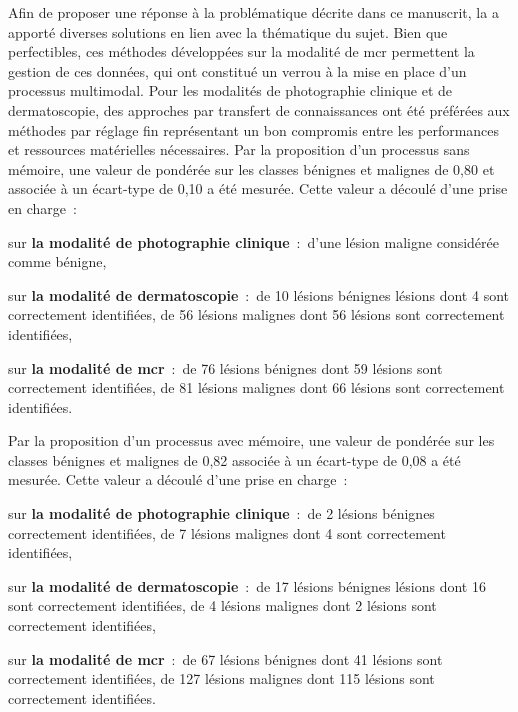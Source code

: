 Afin de proposer une réponse à la problématique décrite dans ce manuscrit, la  a apporté diverses solutions en lien avec la thématique du sujet. Bien que perfectibles, ces méthodes développées sur la modalité de \gls{mcr} permettent la gestion de ces données, qui ont constitué un verrou à la mise en place d'un processus multimodal. Pour les modalités de photographie clinique et de dermatoscopie, des approches par transfert de connaissances ont été préférées aux méthodes par réglage fin représentant un bon compromis entre les performances et ressources matérielles nécessaires. Par la proposition d'un processus sans mémoire, une valeur de \fscore{} pondérée sur les classes bénignes et malignes de 0,80 et associée à un écart-type de 0,10 a été mesurée. Cette valeur a découlé d'une prise en charge~:
\begin{inlinerate}
    \item sur \textbf{la modalité de photographie clinique}~:~d'une lésion maligne considérée comme bénigne,
    \item sur \textbf{la modalité de dermatoscopie}~:~de 10 lésions bénignes lésions dont 4 sont correctement identifiées, de 56 lésions malignes dont 56 lésions sont correctement identifiées,
    \item sur \textbf{la modalité de \gls{mcr}}~:~de 76 lésions bénignes dont 59 lésions sont correctement identifiées, de 81 lésions malignes dont 66 lésions sont correctement identifiées.
\end{inlinerate} Par la proposition d'un processus avec mémoire, une valeur de \fscore{} pondérée sur les classes bénignes et malignes de 0,82 associée à un écart-type de 0,08 a été mesurée. Cette valeur a découlé d'une prise en charge~:
\begin{inlinerate}
    \item sur \textbf{la modalité de photographie clinique}~:~de 2 lésions bénignes correctement identifiées, de 7 lésions malignes dont 4 sont correctement identifiées,
    \item sur \textbf{la modalité de dermatoscopie}~:~de 17 lésions bénignes lésions dont 16 sont correctement identifiées, de 4 lésions malignes dont 2 lésions sont correctement identifiées,
    \item sur \textbf{la modalité de \gls{mcr}}~:~de 67 lésions bénignes dont 41 lésions sont correctement identifiées, de 127 lésions malignes dont 115 lésions sont correctement identifiées.
\end{inlinerate}\par

